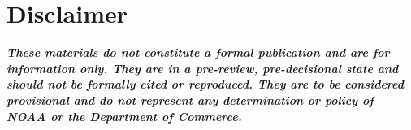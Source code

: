 \documentclass[11pt,
  english,
  a4paper,
]{article}
\begin{document}
\pagestyle{plain}  %
\renewcommand*{\thefootnote}{\arabic{footnote}}  %
\setcounter{footnote}{0}  %
\renewcommand{\headrulewidth}{0.5pt}
\renewcommand{\footrulewidth}{0.5pt}

\newcommand{\lt}{\ensuremath <}
\newcommand{\gt}{\ensuremath >}

\newlength{\cslhangindent}
\setlength{\cslhangindent}{1.5em}
\newenvironment{cslreferences}%
  {\setlength{\parindent}{0pt}%
  \everypar{\setlength{\hangindent}{\cslhangindent}}\ignorespaces}%
  {\par}

\setcounter{page}{1}

\renewcommand{\thetable}{\roman{table}}
\renewcommand{\thefigure}{\roman{figure}}

\setlength\parskip{0.5em plus 0.1em minus 0.2em}

\vspace{500cm}


\hypertarget{disclaimer}{%
\section*{Disclaimer}\label{disclaimer}}

\leavevmode\tagmcend\tagstructend


\emph{\textbf{These materials do not constitute a formal publication and are for information only. They are in a pre-review, pre-decisional state and should not be formally cited or reproduced. They are to be considered provisional and do not represent any determination or policy of NOAA or the Department of Commerce.}}

\leavevmode\tagmcend\tagstructend\par

\pagebreak

\pagebreak
\setlength{\parskip}{5mm plus1mm minus1mm}
\setcounter{page}{1}
\renewcommand{\thefigure}{\arabic{figure}}
\renewcommand{\thetable}{\arabic{table}}
\end{document}
